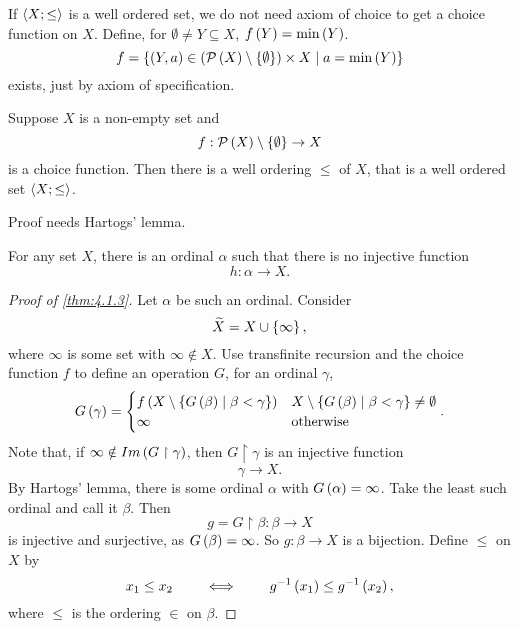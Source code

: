 \begin{note}
If $ \left\langle X; \le \right\rangle $ is a well ordered set, we do not need axiom of choice to get a choice function on $ X $. Define, for $ \emptyset \ne Y \subseteq X $, $ f\left( Y \right) = \min\left( Y \right) $.
$$ f = \left\{ \left( Y, a \right) \in \left( \mathcal{P}\left( X \right) \setminus \left\{ \emptyset \right\} \right) \times X \mid a = \min\left( Y \right) \right\} $$
exists, just by axiom of specification. 
\end{note}

\begin{theorem}
\label{thm:4.1.3}
Suppose $ X $ is a non-empty set and
$$ f : \mathcal{P}\left( X \right) \setminus \left\{ \emptyset \right\} \to X $$
is a choice function. Then there is a well ordering $ \le $ of $ X $, that is a well ordered set $ \left\langle X; \le \right\rangle $.
\end{theorem}

Proof needs Hartogs' lemma.

\begin{lemma}
\label{lem:4.1.4}
For any set $ X $, there is an ordinal $ \alpha $ such that there is no injective function
$$ h : \alpha \to X. $$
\end{lemma}

\begin{proof}[Proof of \ref{thm:4.1.3}]
Let $ \alpha $ be such an ordinal. Consider
$$ \widetilde{X} = X \cup \left\{ \infty \right\}, $$
where $ \infty $ is some set with $ \infty \notin X $. Use transfinite recursion and the choice function $ f $ to define an operation $ G $, for an ordinal $ \gamma $,
$$ G\left( \gamma \right) =
\begin{cases}
f\left( X \setminus \left\{ G\left( \beta \right) \mid \beta < \gamma \right\} \right) & X \setminus \left\{ G\left( \beta \right) \mid \beta < \gamma \right\} \ne \emptyset \\
\infty & \text{otherwise}
\end{cases}.
$$
Note that, if $ \infty \notin Im\left( G \upharpoonright \gamma \right) $, then $ G \upharpoonright \gamma $ is an injective function
$$ \gamma \to X. $$
By Hartogs' lemma, there is some ordinal $ \alpha $ with $ G\left( \alpha \right) = \infty $. Take the least such ordinal and call it $ \beta $. Then
$$ g = G \upharpoonright \beta : \beta \to X $$
is injective and surjective, as $ G\left( \beta \right) = \infty $. So $ g : \beta \to X $ is a bijection. Define $ \le $ on $ X $ by
$$ x_1 \le x_2 \qquad \iff \qquad g^{-1}\left( x_1 \right) \le g^{-1}\left( x_2 \right), $$
where $ \le $ is the ordering $ \in $ on $ \beta $.
\end{proof}

\pagebreak

